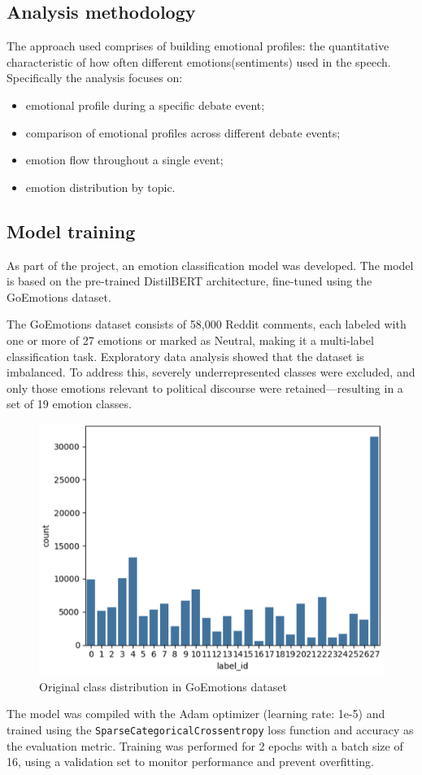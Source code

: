 \documentclass[pdflatex,sn-mathphys-num]{sn-jnl}%
\begin{document}
\subsection{Analysis methodology}

The approach used comprises of building emotional profiles: the quantitative characteristic of how often different emotions(sentiments) used in the speech.
Specifically the analysis focuses on:
\begin{itemize}
	\item emotional profile during a specific debate event;
	\item comparison of emotional profiles across different debate events;
	\item emotion flow throughout a single event;
	\item emotion distribution by topic.
\end{itemize}

\subsection{Model training}

As part of the project, an emotion classification model was developed. The model is based on the pre-trained DistilBERT architecture, fine-tuned using the GoEmotions dataset. 

The GoEmotions dataset consists of 58,000 Reddit comments, each labeled with one or more of 27 emotions or marked as Neutral, making it a multi-label classification task.
Exploratory data analysis showed that the dataset is imbalanced. To address this, severely underrepresented classes were excluded, and only those emotions relevant to political discourse were retained—resulting in a set of 19 emotion classes.
\begin{figure}[h]
	\centering
	\includegraphics[width=12cm]{f1-label_distribution.png}
	\caption{Original class distribution in GoEmotions dataset}
\end{figure}

The model was compiled with the Adam optimizer (learning rate: 1e-5) and trained using the \texttt{SparseCategoricalCrossentropy} loss function and accuracy as the evaluation metric. Training was performed for 2 epochs with a batch size of 16, using a validation set to monitor performance and prevent overfitting.
\end{document}
